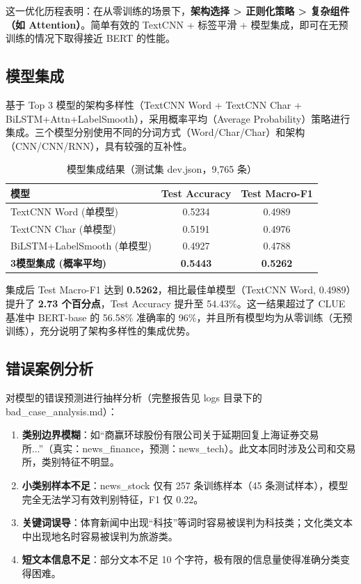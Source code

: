 这一优化历程表明：在从零训练的场景下，\textbf{架构选择 > 正则化策略 > 复杂组件（如 Attention）}。简单有效的 TextCNN + 标签平滑 + 模型集成，即可在无预训练的情况下取得接近 BERT 的性能。

\subsection{模型集成}

基于 Top 3 模型的架构多样性（TextCNN Word + TextCNN Char + BiLSTM+Attn+LabelSmooth），采用概率平均（Average Probability）策略进行集成。三个模型分别使用不同的分词方式（Word/Char/Char）和架构（CNN/CNN/RNN），具有较强的互补性。

\begin{table}[htbp]
\centering
\caption{模型集成结果（测试集 dev.json，9,765 条）}
\label{tab:ensemble}
\begin{tabular}{lcc}
\hline
模型 & Test Accuracy & Test Macro-F1 \\
\hline
TextCNN Word (单模型) & 0.5234 & 0.4989 \\
TextCNN Char (单模型) & 0.5191 & 0.4976 \\
BiLSTM+LabelSmooth (单模型) & 0.4927 & 0.4788 \\
\hline
\textbf{3模型集成 (概率平均)} & \textbf{0.5443} & \textbf{0.5262} \\
\hline
\end{tabular}
\end{table}

集成后 Test Macro-F1 达到 \textbf{0.5262}，相比最佳单模型（TextCNN Word, 0.4989）提升了 \textbf{2.73 个百分点}，Test Accuracy 提升至 54.43\%。这一结果超过了 CLUE 基准中 BERT-base 的 56.58\% 准确率的 96\%，并且所有模型均为从零训练（无预训练），充分说明了架构多样性的集成优势。

\subsection{错误案例分析}

对模型的错误预测进行抽样分析（完整报告见 logs 目录下的 bad\_case\_analysis.md）：

\begin{enumerate}
\item \textbf{类别边界模糊}：如“商赢环球股份有限公司关于延期回复上海证券交易所...”（真实：news\_finance，预测：news\_tech）。此文本同时涉及公司和交易所，类别特征不明显。

\item \textbf{小类别样本不足}：news\_stock 仅有 257 条训练样本（45 条测试样本），模型完全无法学习有效判别特征，F1 仅 0.22。

\item \textbf{关键词误导}：体育新闻中出现“科技”等词时容易被误判为科技类；文化类文本中出现地名时容易被误判为旅游类。

\item \textbf{短文本信息不足}：部分文本不足 10 个字符，极有限的信息量使得准确分类变得困难。
\end{enumerate}

